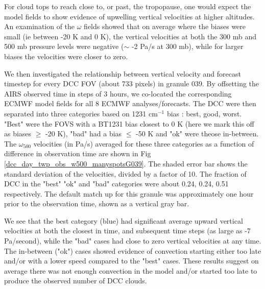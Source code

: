 \documentclass[agupp]{aguplus}              %
\newcommand{\wn}{cm$^{-1}$\xspace}
\begin{document}
\begin{article}
For cloud tops to reach close to, or past, the tropopause, one would
expect the model fields to show evidence of upwelling vertical
velocities at higher altitudes. An examination of the $\omega$ fields
showed that on average where the biases were small (ie between -20 K
and 0 K), the vertical velocities at both the 300 mb and 500 mb
pressure levels were negative ($\sim$ -2 Pa/s at 300 mb), while for
larger biases the velocities were closer to zero.

We then investigated the relationship between vertical velocity and
forecast timestep for every DCC FOV (about 733 pixels) in granule
039. By offsetting the AIRS observed time in steps of 3 hours, we
co-located the corresponding ECMWF model fields for all 8 ECMWF
analyses/forecasts. The DCC were then separated into three categories
based on 1231 \wn bias : best, good, worst.  "Best" were the FOVS with
a BT1231 bias closest to 0 K (here we mark this off as biases $\ge$
-20 K), "bad" had a bias $\le$ -50 K and "ok" were theose
in-between. The $\omega_{500}$ velocities (in Pa/s) averaged for these
three categories as a function of difference in observation time are
shown in Fig \ref{dcc_day_twp_obs_w500_manyspotsG039}. The shaded
error bar shows the standard deviation of the velocities, divided by a
factor of 10. The fraction of DCC in the "best" "ok" and "bad"
categories were about 0.24, 0.24, 0.51 respectively.  The default
match up for this granule was approximately one hour prior to the
observation time, shown as a vertical gray bar.

We see that the best category (blue) had significant
average upward vertical velocities at both the closest in time, and
subsequent time steps (as large as -7 Pa/second), while the "bad"
cases had close to zero vertical velocities at any time. The
in-between ("ok") cases showed evidence of convection starting either too
late and/or with a lower speed compared to the "best"
cases. These results suggest on average there was not enough convection in the
model and/or started too late to produce the observed number of DCC
clouds.


\end{article}
\end{document}
